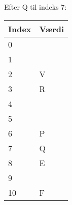 \documentclass{article}
\begin{document}
Efter Q til indeks 7:
\begin{table}[H]
\centering
\begin{tabular}{|l|l|}
\hline
\rowcolor[HTML]{C0C0C0} 
Index & Værdi \\ \hline
0     &       \\ \hline
1     &       \\ \hline
2     & V     \\ \hline
3     & R     \\ \hline
4     &       \\ \hline
5     &       \\ \hline
6     & P     \\ \hline
7     & Q     \\ \hline
8     & E     \\ \hline
9     &       \\ \hline
10    & F     \\ \hline
\end{tabular}
\end{table}
\end{document}
